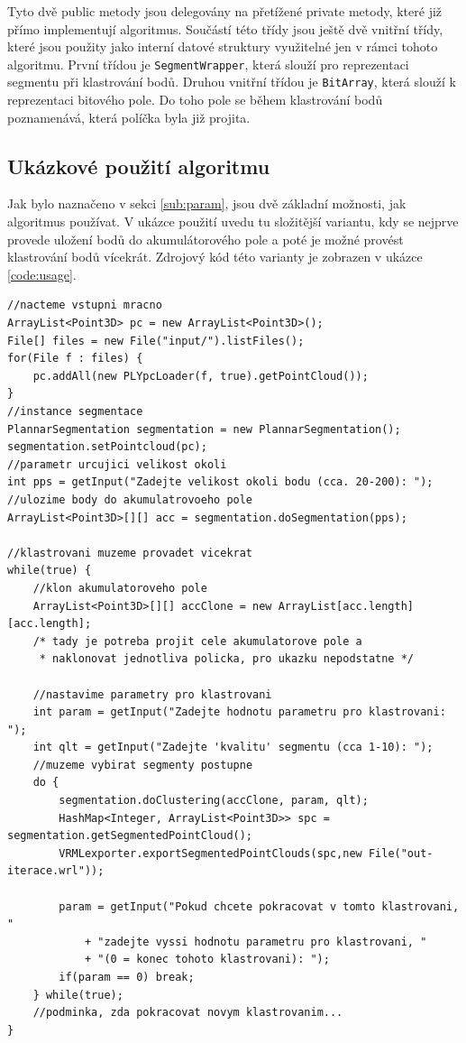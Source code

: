 \documentclass[11pt,twoside,a4paper]{book}
\begin{document}
Tyto dvě public metody jsou delegovány na přetížené private metody, které již přímo implementují algoritmus. Součástí této třídy jsou ještě dvě vnitřní třídy, které jsou použity jako interní datové struktury využitelné jen v rámci tohoto algoritmu. První třídou je \verb|SegmentWrapper|, která slouží pro reprezentaci segmentu při klastrování bodů. Druhou vnitřní třídou je \verb|BitArray|, která slouží k reprezentaci bitového pole. Do toho pole se během klastrování bodů poznamenává, která políčka byla již projita. 

\subsection{Ukázkové použití algoritmu}
\label{sub:pouziti}

Jak bylo naznačeno v sekci \ref{sub:param}, jsou dvě základní možnosti, jak algoritmus používat. V ukázce použití uvedu tu složitější variantu, kdy se nejprve provede uložení bodů do akumulátorového pole a poté je možné provést klastrování bodů vícekrát. Zdrojový kód této varianty je zobrazen v ukázce \ref{code:usage}. 

\begin{lstlisting}[label={code:usage},caption={Ukázkové použití implementace algoritmu.}]
//nacteme vstupni mracno
ArrayList<Point3D> pc = new ArrayList<Point3D>();
File[] files = new File("input/").listFiles();
for(File f : files) {
    pc.addAll(new PLYpcLoader(f, true).getPointCloud());
}
//instance segmentace
PlannarSegmentation segmentation = new PlannarSegmentation();
segmentation.setPointcloud(pc);
//parametr urcujici velikost okoli
int pps = getInput("Zadejte velikost okoli bodu (cca. 20-200): ");
//ulozime body do akumulatrovoeho pole
ArrayList<Point3D>[][] acc = segmentation.doSegmentation(pps);

//klastrovani muzeme provadet vicekrat
while(true) {
	//klon akumulatoroveho pole
	ArrayList<Point3D>[][] accClone = new ArrayList[acc.length][acc.length];
	/* tady je potreba projit cele akumulatorove pole a 
	 * naklonovat jednotliva policka, pro ukazku nepodstatne */
	
	//nastavime parametry pro klastrovani
	int param = getInput("Zadejte hodnotu parametru pro klastrovani: ");
	int qlt = getInput("Zadejte 'kvalitu' segmentu (cca 1-10): ");  
	//muzeme vybirat segmenty postupne 
	do {
		segmentation.doClustering(accClone, param, qlt);
		HashMap<Integer, ArrayList<Point3D>> spc = segmentation.getSegmentedPointCloud();
		VRMLexporter.exportSegmentedPointClouds(spc,new File("out-iterace.wrl"));

		param = getInput("Pokud chcete pokracovat v tomto klastrovani, "
			+ "zadejte vyssi hodnotu parametru pro klastrovani, "
			+ "(0 = konec tohoto klastrovani): ");
		if(param == 0) break;
	} while(true);
	//podminka, zda pokracovat novym klastrovanim...
}
\end{lstlisting}
\end{document}
